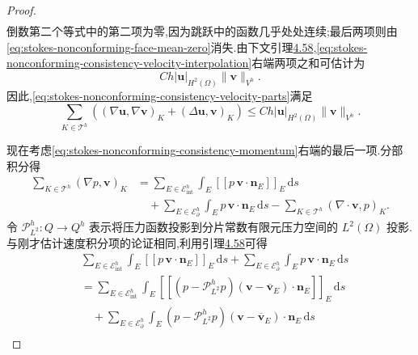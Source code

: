 \begin{proof}
\[\begin{aligned}
\end{aligned}
\]
倒数第二个等式中的第二项为零,因为跳跃中的函数几乎处处连续;最后两项则由\cref{eq:stokes-nonconforming-face-mean-zero}消失.由下文引理\hyperref[lem:stokes-nonconforming-jump-estimate]{4.58},\cref{eq:stokes-nonconforming-consistency-velocity-interpolation}右端两项之和可估计为
\[
  Ch|\bm{u}|_{H^2(\Omega)}\|\bm{v}\|_{V^h}.
\]
因此,\cref{eq:stokes-nonconforming-consistency-velocity-parts}满足
\begin{equation}\label{eq:stokes-nonconforming-consistency-velocity-bound}
  \sum_{K\in\mathcal{T}^h}
      \left((\nabla\bm{u},\nabla\bm{v})_K
            +(\Delta\bm{u},\bm{v})_K\right)
  \leq Ch|\bm{u}|_{H^2(\Omega)}\|\bm{v}\|_{V^h}.
\end{equation}

现在考虑\cref{eq:stokes-nonconforming-consistency-momentum}右端的最后一项.分部积分得
\begin{equation}\label{eq:stokes-nonconforming-consistency-pressure-parts}
\begin{aligned}
  \sum_{K\in\mathcal{T}^h}(\nabla p,\bm{v})_K
  &=\sum_{E\in\mathcal{E}_{\mathrm{int}}^h}
       \int_E\left[\!\left[p\,\bm{v}\cdot\bm{n}_E\right]\!\right]_E
          \,\mathrm{d}s\\
  &\quad+\sum_{E\in\mathcal{E}_{\partial}^h}
       \int_Ep\,\bm{v}\cdot\bm{n}_E\,\mathrm{d}s
       -\sum_{K\in\mathcal{T}^h}
       (\nabla\cdot\bm{v},p)_K.
\end{aligned}
\end{equation}
令 $\mathcal{P}_{L^2}^h:Q\to Q^h$ 表示将压力函数投影到分片常数有限元压力空间的 $L^2(\Omega)$ 投影.与刚才估计速度积分项的论证相同,利用引理\hyperref[lem:stokes-nonconforming-jump-estimate]{4.58}可得
\begin{equation}\label{eq:stokes-nonconforming-consistency-pressure-boundary}
\begin{aligned}
  &\sum_{E\in\mathcal{E}_{\mathrm{int}}^h}
       \int_E\left[\!\left[p\,\bm{v}\cdot\bm{n}_E\right]\!\right]_E
          \,\mathrm{d}s
   +\sum_{E\in\mathcal{E}_{\partial}^h}
       \int_Ep\,\bm{v}\cdot\bm{n}_E\,\mathrm{d}s\\
  &=\sum_{E\in\mathcal{E}_{\mathrm{int}}^h}
       \int_E\left[\!\left[
          (p-\mathcal{P}_{L^2}^hp)
          (\bm{v}-\overline{\bm{v}}_E)\cdot\bm{n}_E
       \right]\!\right]_E\,\mathrm{d}s\\
  &\quad+\sum_{E\in\mathcal{E}_{\partial}^h}
       \int_E(p-\mathcal{P}_{L^2}^hp)
          (\bm{v}-\overline{\bm{v}}_E)\cdot\bm{n}_E\,\mathrm{d}s\\

\end{aligned}
\end{equation}
\end{proof}

